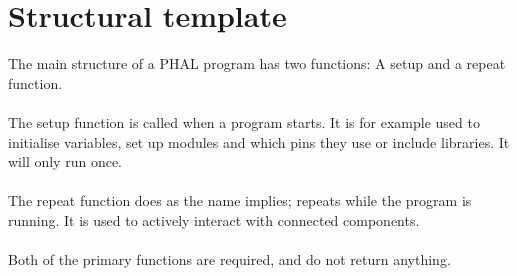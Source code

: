\section{Structural template}
The main structure of a PHAL program has two functions: A setup and a repeat function.
\\\\
The setup function is called when a program starts. 
It is for example used to initialise variables, set up modules and which pins they use or include libraries. It will only run once.
\\\\
The repeat function does as the name implies; repeats while the program is running. 
It is used to actively interact with connected components.
\\\\
Both of the primary functions are required, and do not return anything.
